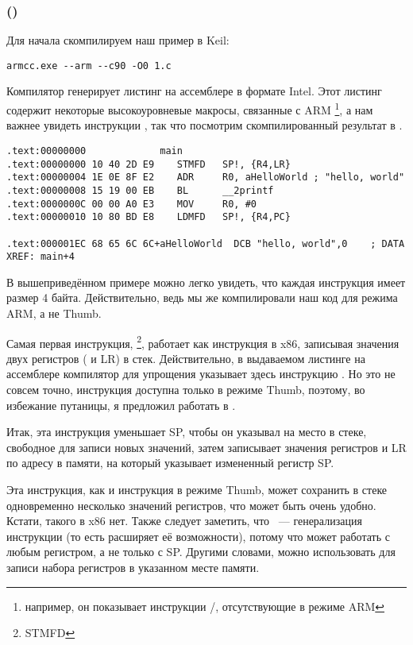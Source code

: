 \subsubsection{\NonOptimizingKeilVI (\ARMMode)}

Для начала скомпилируем наш пример в Keil:

\begin{lstlisting}
armcc.exe --arm --c90 -O0 1.c 
\end{lstlisting}

\myindex{\IntelSyntax}
Компилятор  генерирует листинг на ассемблере в формате Intel.
Этот листинг содержит некоторые высокоуровневые макросы, связанные с ARM
\footnote{например, он показывает инструкции \PUSH/\POP, отсутствующие в режиме ARM},
а нам важнее увидеть инструкции , так что посмотрим скомпилированный результат в \IDA.

\begin{lstlisting}[caption=\NonOptimizingKeilVI (\ARMMode) \IDA]
.text:00000000             main
.text:00000000 10 40 2D E9    STMFD   SP!, {R4,LR}
.text:00000004 1E 0E 8F E2    ADR     R0, aHelloWorld ; "hello, world"
.text:00000008 15 19 00 EB    BL      __2printf
.text:0000000C 00 00 A0 E3    MOV     R0, #0
.text:00000010 10 80 BD E8    LDMFD   SP!, {R4,PC}

.text:000001EC 68 65 6C 6C+aHelloWorld  DCB "hello, world",0    ; DATA XREF: main+4
\end{lstlisting}

В вышеприведённом примере можно легко увидеть, что каждая инструкция имеет размер 4 байта.
Действительно, ведь мы же компилировали наш код для режима ARM, а не Thumb.

Самая первая инструкция, \footnote{\ac{STMFD}},
работает как инструкция \PUSH в x86, записывая значения двух регистров ( и \ac{LR}) в стек.
Действительно, в выдаваемом листинге на ассемблере компилятор  для упрощения указывает здесь инструкцию
.
Но это не совсем точно, инструкция \PUSH доступна только в режиме Thumb, поэтому,
во избежание путаницы, я предложил работать в \IDA.

Итак, эта инструкция уменьшает \ac{SP}, чтобы он указывал на место в стеке, свободное для записи
новых значений, затем записывает значения регистров  и \ac{LR} 
по адресу в памяти, на который указывает измененный регистр \ac{SP}.

Эта инструкция, как и инструкция \PUSH в режиме Thumb, может сохранить в стеке одновременно несколько значений регистров, что может быть очень удобно.
Кстати, такого в x86 нет.
Также следует заметить, что ~--- генерализация инструкции \PUSH (то есть расширяет её возможности), потому что может работать с любым регистром, а не только с \ac{SP}.
Другими словами,  можно использовать для записи набора регистров в указанном месте памяти.


